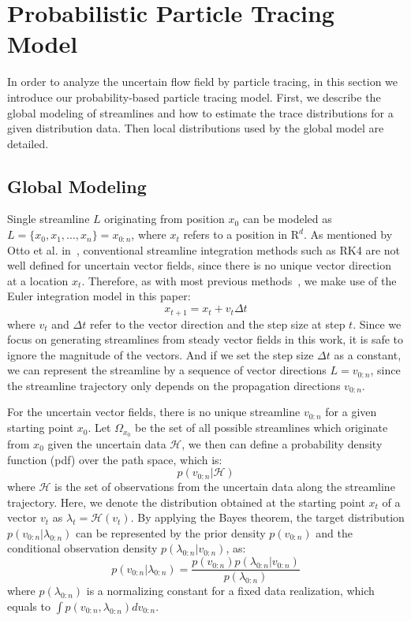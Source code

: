 \section{Probabilistic Particle Tracing Model}

In order to analyze the uncertain flow field by particle tracing, in this section we introduce our probability-based particle tracing model. First, we describe the global modeling of streamlines and how to estimate the trace distributions for a given distribution data. Then local distributions used by the global model are detailed.

\subsection{Global Modeling}

Single streamline $L$ originating from position ${x_0}$ can be modeled as $L = \{ {x_0},{x_1},...,{x_n}\} = {x_{0:n}}$, where $x_t$ refers to a position in $\mathrm{R}^d$. As mentioned by Otto et al. in~\cite{Otto10a, Otto11a}, conventional streamline integration methods such as RK4 are not well defined for uncertain vector fields, since there is no unique vector direction at a location ${x_t}$. Therefore, as with most previous methods~\cite{Otto10a, Otto11a}, we make use of the Euler integration model in this paper:
\begin{equation}
  {x_{t + 1}} = {x_t} + {v_t}\Delta t
\end{equation}
where ${v_t}$ and $\Delta t$ refer to the vector direction and the step size at step $t$. Since we focus on generating streamlines from steady vector fields in this work, it is safe to ignore the magnitude of the vectors. And if we set the step size $\Delta t$ as a constant, we can represent the streamline by a sequence of vector directions ${L = v_{0:n}}$, since the streamline trajectory only depends on the propagation directions $v_{0:n}$.

For the uncertain vector fields, there is no unique streamline $v_{0:n}$ for a given starting point $x_0$. Let $\Omega_{x_0}$ be the set of all possible streamlines which originate from $x_0$ given the uncertain data $\mathcal{H}$, we then can define a probability density function (pdf) over the path space, which is:
\begin{equation}
  p(v_{0:n}|\mathcal{H})
\end{equation}
where $\mathcal{H}$ is the set of observations from the uncertain data along the streamline trajectory. Here, we denote the distribution obtained at the starting point $x_t$ of a vector $v_t$ as $\lambda_t=\mathcal{H}(v_t)$. By applying the Bayes theorem, the target distribution $p({v_{0:n}}|{\lambda_{0:n}})$ can be represented by the prior density $p({v_{0:n}})$ and the conditional observation density $p({\lambda_{0:n}}|{v_{0:n}})$, as:
\begin{equation}
  p({v_{0:n}}|{\lambda_{0:n}}) = \frac{{p({v_{0:n}})p({\lambda_{0:n}}|{v_{0:n}})}}{{p({\lambda_{0:n}})}}
\end{equation}
where ${p({\lambda_{0:n}})}$ is a normalizing constant for a fixed data realization, which equals to $\int {p({v_{0:n}},{\lambda_{0:n}})} d{v_{0:n}}$.

